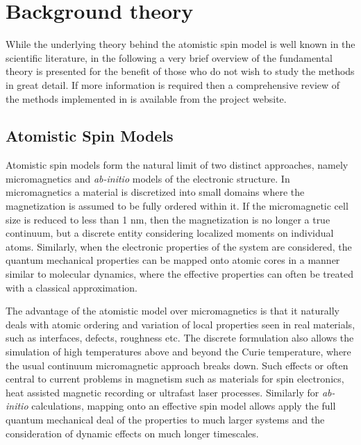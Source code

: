 \chapter{Background theory}\label{chap:theory}
While the underlying theory behind the atomistic spin model is well known in the scientific literature, in the following a very brief overview of the fundamental theory is presented for the benefit of those who do not wish to study the methods in great detail. If more information is required then a comprehensive review of the methods implemented in \vampire is available from the project website.

\section*{Atomistic Spin Models}
Atomistic spin models form the natural limit of two distinct approaches, namely micromagnetics and \textit{ab-initio} models of the electronic structure. In
micromagnetics a material is discretized into small domains where the magnetization is assumed to be fully ordered within it. If the micromagnetic cell size is
reduced to less than 1 nm, then the magnetization is no longer a true continuum, but a discrete entity considering localized moments on individual atoms.
Similarly, when the electronic properties of the system are considered, the quantum mechanical properties can be mapped onto atomic cores in a manner similar
to molecular dynamics, where the effective properties can often be treated with a classical approximation.

The advantage of the atomistic model over micromagnetics is that it naturally deals with atomic ordering and variation of local properties seen in real
materials, such as interfaces, defects, roughness etc. The discrete formulation also allows the simulation of high temperatures above and beyond the Curie
temperature, where the usual continuum micromagnetic approach breaks down. Such effects or often central to current problems in magnetism such as materials for
spin electronics, heat assisted magnetic recording or ultrafast laser processes. Similarly for \textit{ab-initio} calculations, mapping onto an effective spin
model allows apply the full quantum mechanical deal of the properties to much larger systems and the consideration of dynamic effects on much longer
timescales.


